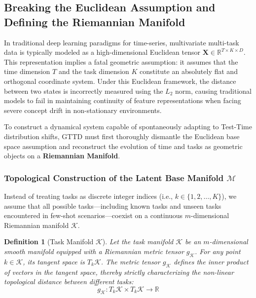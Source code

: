 \documentclass{article}
\newtheorem{definition}{Definition}[section]
\begin{document}
\subsection{Breaking the Euclidean Assumption and Defining the Riemannian Manifold}

In traditional deep learning paradigms for time-series, multivariate multi-task data is typically modeled as a high-dimensional Euclidean tensor $\mathbf{X} \in \mathbb{R}^{T \times K \times D}$. This representation implies a fatal geometric assumption: it assumes that the time dimension $T$ and the task dimension $K$ constitute an absolutely flat and orthogonal coordinate system. Under this Euclidean framework, the distance between two states is incorrectly measured using the $L_2$ norm, causing traditional models to fail in maintaining continuity of feature representations when facing severe concept drift in non-stationary environments.

To construct a dynamical system capable of spontaneously adapting to Test-Time distribution shifts, GTTD must first thoroughly dismantle the Euclidean base space assumption and reconstruct the evolution of time and tasks as geometric objects on a \textbf{Riemannian Manifold}.

\subsubsection{Topological Construction of the Latent Base Manifold \texorpdfstring{$\mathcal{M}$}{M}}

Instead of treating tasks as discrete integer indices (i.e., $k \in \{1, 2, \dots, K\}$), we assume that all possible tasks---including known tasks and unseen tasks encountered in few-shot scenarios---coexist on a continuous $m$-dimensional Riemannian manifold $\mathcal{K}$.

\begin{definition}[Task Manifold $\mathcal{K}$]
Let the task manifold $\mathcal{K}$ be an $m$-dimensional smooth manifold equipped with a Riemannian metric tensor $g_{\mathcal{K}}$. For any point $k \in \mathcal{K}$, its tangent space is $T_k\mathcal{K}$. The metric tensor $g_{\mathcal{K}}$ defines the inner product of vectors in the tangent space, thereby strictly characterizing the non-linear topological distance between different tasks:
\begin{equation}
g_{\mathcal{K}} : T_k\mathcal{K} \times T_k\mathcal{K} \to \mathbb{R}
\end{equation}
\end{definition}
\end{document}

